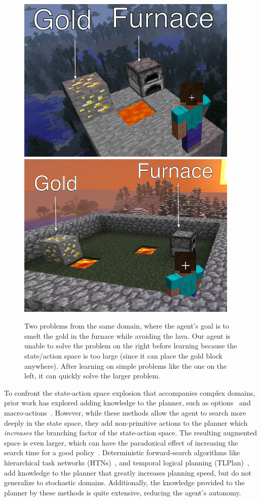 \documentclass[letterpaper]{article}
\begin{document}
\begin{figure}
\centering
\includegraphics[width=0.49\linewidth]{figures/smelt_small.jpg}
\includegraphics[width=0.49\linewidth]{figures/smelt_large.jpg}
\caption{Two problems from the same domain, where the
  agent's goal is to smelt the gold in the furnace while avoiding the
  lava.  Our agent is unable to solve the problem on the right before
  learning because the state/action space is too large (since it can
  place the gold block anywhere).  After learning on simple problems
  like the one on the left, it can quickly
  solve the larger problem.\label{fig:example}}
\end{figure}

To confront the state-action space explosion that accompanies complex domains,
prior work has explored adding knowledge to the planner, such as options~\cite{sutton99} and
macro-actions~\cite{Botea:2005kx,Newton:2005vn}.  However, while these
methods allow the agent to search more deeply in the state space,
they add non-primitive actions to the planner which {\em increases} the
branching factor of the state-action space.  The resulting augmented
space is even larger, which can have the paradoxical effect of
increasing the search time for a good policy~\cite{Jong:2008zr}.
Deterministic forward-search algorithms like hierarchical task
networks (HTNs)~\citep{Nau:1999:SSH:1624312.1624357}, and temporal
logical planning
(TLPlan)~\citep{Bacchus95usingtemporal,Bacchus99usingtemporal}, add
knowledge to the planner that greatly increases planning speed, but do
not generalize to stochastic domains. Additionally, the knowledge
provided to the planner by these methods is quite extensive, reducing
the agent's autonomy.
\end{document}

